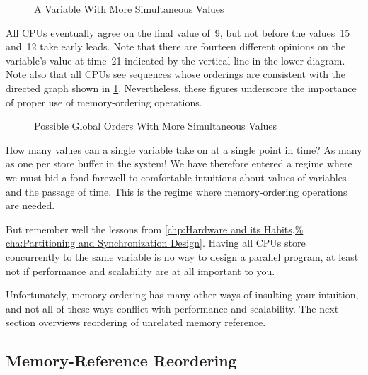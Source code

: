 \begin{figure}
\centering
{}
\caption{A Variable With More Simultaneous Values}
\end{figure}

All CPUs eventually agree on the final value of~9, but not before
the values~15 and~12 take early leads.
Note that there are fourteen different opinions on the variable's value
at time~21 indicated by the vertical line in the lower diagram.
Note also that all CPUs see sequences whose orderings are consistent with
the directed graph shown in
\cref{fig:memorder:Possible Global Orders With More Simultaneous Values}.
Nevertheless, these figures underscore the importance of
proper use of memory-ordering operations.

\begin{figure}
\centering
{}
\caption{Possible Global Orders With More Simultaneous Values}
\label{fig:memorder:Possible Global Orders With More Simultaneous Values}
\end{figure}

How many values can a single variable take on at a single point in
time?
As many as one per store buffer in the system!
We have therefore entered a regime where we must bid a fond farewell to
comfortable intuitions about values of variables and the passage of time.
This is the regime where memory-ordering operations are needed.

But remember well the lessons from
\cref{chp:Hardware and its Habits,%
cha:Partitioning and Synchronization Design}.
Having all CPUs store concurrently to the same variable
is no way to design a parallel program, at least
not if performance and scalability are at all important to you.

Unfortunately, memory ordering has many other ways of insulting your
intuition, and not all of these ways conflict with performance and
scalability.
The next section overviews reordering of unrelated memory reference.

\subsection{Memory-Reference Reordering}
\label{sec:memorder:Memory-Reference Reordering}

